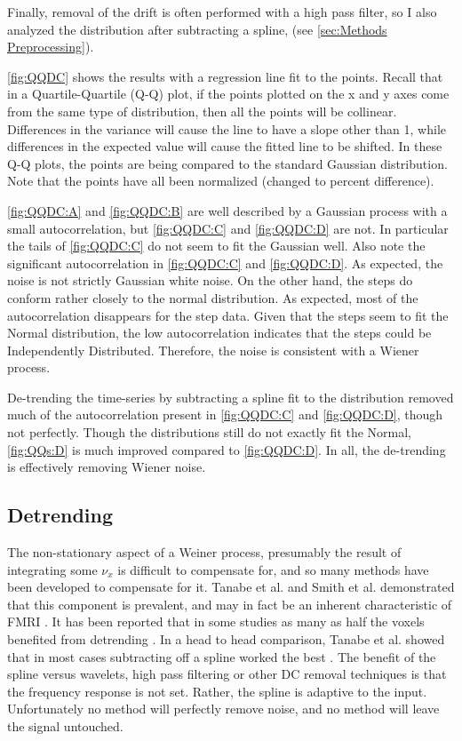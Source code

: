 Finally, removal of the drift is often performed with a high pass filter,
so I also analyzed the distribution after subtracting a spline, (see \autoref{sec:Methods Preprocessing}).

\autoref{fig:QQDC} shows the 
results with a regression line fit to the points.
Recall that in a Quartile-Quartile (Q-Q) plot, if the points plotted on the 
x and y axes come from the same type of distribution, then all the points will
be collinear. Differences in the variance will cause the line to have a slope
other than 1, while differences in the expected value will cause the fitted line
to be shifted. In these Q-Q plots, the points are being compared to the standard
Gaussian distribution. Note that the points have all been 
normalized (changed to percent difference).

\autoref{fig:QQDC:A} and \autoref{fig:QQDC:B}
are well described by a Gaussian process with a small autocorrelation, but 
\autoref{fig:QQDC:C} and \autoref{fig:QQDC:D} are not. In particular the tails of \autoref{fig:QQDC:C}
do not seem to fit the Gaussian well. Also note the significant autocorrelation in
\autoref{fig:QQDC:C} and \autoref{fig:QQDC:D}. As expected, the noise is not strictly
Gaussian white noise.  On the other hand, the steps do conform rather
closely to the normal distribution.
As expected, most of the autocorrelation disappears for the step data. Given
that the steps seem to fit the Normal distribution, the low autocorrelation
indicates that the steps could be Independently Distributed. 
Therefore, the noise is consistent with a Wiener process. 

De-trending the time-series by subtracting a spline fit to the distribution
removed much of the autocorrelation present in \autoref{fig:QQDC:C} and \autoref{fig:QQDC:D},
though not perfectly. Though the distributions still do not exactly fit
the Normal, \autoref{fig:QQs:D} is much improved compared to \autoref{fig:QQDC:D}.
In all, the de-trending is effectively removing Wiener noise. 

\subsection{Detrending}
\label{sec:Detrend}
The non-stationary
aspect of a Weiner process, presumably the result of integrating some
$\nu_x$ is difficult to compensate for, and so many methods
have been developed to compensate for it. Tanabe et al. and Smith et al. 
demonstrated that this component is prevalent, and may in fact be an inherent  characteristic
of FMRI \cite{Tanabe2002, Smith1999}. It has been reported that in some studies as 
many as half the voxels 
benefited from detrending \cite{Smith2007}. In a head to head comparison, 
Tanabe et al.  showed that in most cases subtracting off
a spline worked the best \cite{Tanabe2002}. 
The benefit of the spline versus wavelets, high pass 
filtering or other DC removal techniques is that the frequency response is not set.
Rather, the spline is adaptive to the input. Unfortunately no method will 
perfectly remove noise, and no method will leave the signal untouched.

